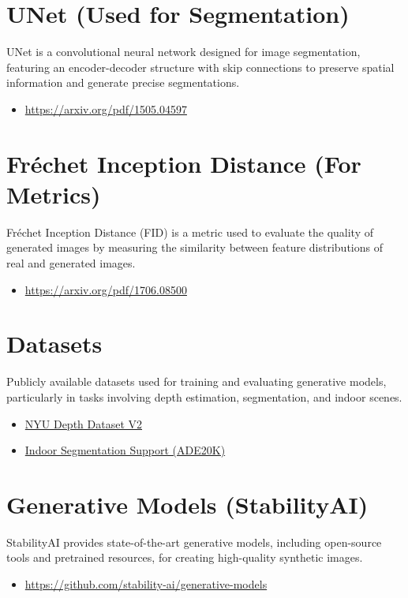 \documentclass[12pt,a4paper]{report}
\begin{document}
\section*{UNet (Used for Segmentation)}
UNet is a convolutional neural network designed for image segmentation, featuring an encoder-decoder structure with skip connections to preserve spatial information and generate precise segmentations.
\begin{itemize}
    \item \href{https://arxiv.org/pdf/1505.04597}{https://arxiv.org/pdf/1505.04597}
\end{itemize}

\section*{Fréchet Inception Distance (For Metrics)}
Fréchet Inception Distance (FID) is a metric used to evaluate the quality of generated images by measuring the similarity between feature distributions of real and generated images.
\begin{itemize}
    \item \href{https://arxiv.org/pdf/1706.08500}{https://arxiv.org/pdf/1706.08500}
\end{itemize}

\section*{Datasets}
Publicly available datasets used for training and evaluating generative models, particularly in tasks involving depth estimation, segmentation, and indoor scenes.
\begin{itemize}
    \item \href{https://cs.nyu.edu/~fergus/datasets/nyu_depth_v2.html}{NYU Depth Dataset V2}
    \item \href{https://cs.nyu.edu/~fergus/datasets/indoor_seg_support.pdf}{Indoor Segmentation Support (ADE20K)}
\end{itemize}

\section*{Generative Models (StabilityAI)}
StabilityAI provides state-of-the-art generative models, including open-source tools and pretrained resources, for creating high-quality synthetic images.
\begin{itemize}
    \item \href{https://github.com/stability-ai/generative-models}{https://github.com/stability-ai/generative-models}
\end{itemize}
\end{document}
